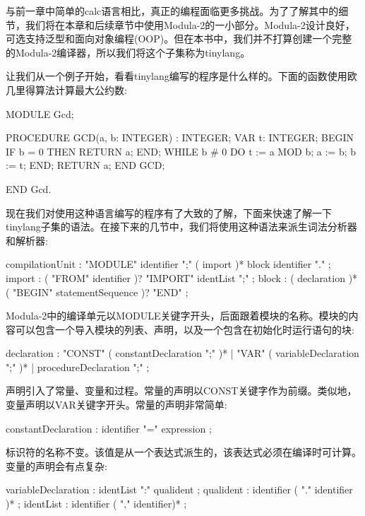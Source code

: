 与前一章中简单的calc语言相比，真正的编程面临更多挑战。为了了解其中的细节，我们将在本章和后续章节中使用Modula-2的一小部分。Modula-2设计良好，可选支持泛型和面向对象编程(OOP)。但在本书中，我们并不打算创建一个完整的Modula-2编译器，所以我们将这个子集称为tinylang。

让我们从一个例子开始，看看tinylang编写的程序是什么样的。下面的函数使用欧几里得算法计算最大公约数:

\begin{shell}
MODULE Gcd;

PROCEDURE GCD(a, b: INTEGER) : INTEGER;
VAR t: INTEGER;
BEGIN
    IF b = 0 THEN
        RETURN a;
    END;
    WHILE b # 0 DO
        t := a MOD b;
        a := b;
        b := t;
    END;
    RETURN a;
END GCD;

END Gcd.
\end{shell}

现在我们对使用这种语言编写的程序有了大致的了解，下面来快速了解一下tinylang子集的语法。在接下来的几节中，我们将使用这种语法来派生词法分析器和解析器:

\begin{shell}
compilationUnit
    : "MODULE" identifier ";" ( import )* block identifier "." ;
import : ( "FROM" identifier )? "IMPORT" identList ";" ;
block
    : ( declaration )* ( "BEGIN" statementSequence )? "END" ;
\end{shell}

Modula-2中的编译单元以MODULE关键字开头，后面跟着模块的名称。模块的内容可以包含一个导入模块的列表、声明，以及一个包含在初始化时运行语句的块:

\begin{shell}
declaration
    : "CONST" ( constantDeclaration ";" )*
    | "VAR" ( variableDeclaration ";" )*
    | procedureDeclaration ";" ;
\end{shell}

声明引入了常量、变量和过程。常量的声明以CONST关键字作为前缀。类似地，变量声明以VAR关键字开头。常量的声明非常简单:

\begin{shell}
constantDeclaration : identifier "=" expression ;
\end{shell}

标识符的名称不变。该值是从一个表达式派生的，该表达式必须在编译时可计算。变量的声明会有点复杂:

\begin{shell}
variableDeclaration : identList ":" qualident ;
qualident : identifier ( "." identifier )* ;
identList : identifier ( "," identifier)* ;
\end{shell}


